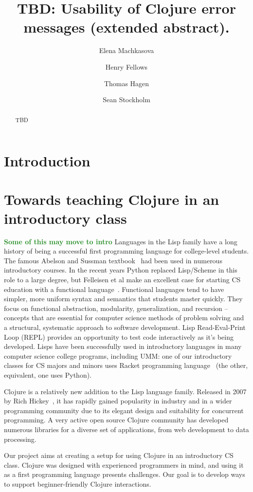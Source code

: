\documentclass[submission,copyright,creativecommons]{eptcs}
\title{TBD: Usability of Clojure error messages (extended abstract).}
\author{Elena Machkasova 
\institute{University of Minnesota, Morris
\email{elenam@morris.umn.edu}}
\and
Henry Fellows
\institute{University of Minnesota, Morris
\email{?@morris.umn.edu}}
\and 
Thomas Hagen
\institute{University of Minnesota, Morris
\email{hagen715@morris.umn.edu}}
\and Sean Stockholm
\institute{University of Minnesota, Morris
\email{?@morris.umn.edu}}
}
\newcommand{\allcomments}[1]{{#1}}
\newcommand{\emcomment}[1]{{\bf \textcolor{ForestGreen}{\allcomments{{#1}}}}}
\begin{document}
\maketitle

\begin{abstract}
TBD
\end{abstract}

\section{Introduction}\label{sec:intro}

\section{Towards teaching Clojure in an introductory class}\label{sec:project}
\emcomment{Some of this may move to intro}
Languages in the Lisp family have a long history of being a successful first programming language for college-level students.
The famous Abelson and Sussman textbook~\cite{Abelson} had been used in numerous introductory courses.
In the recent years Python replaced Lisp/Scheme in this role to a large degree, but 
Felleisen et al make an excellent case for starting CS education with a functional language~\cite{Felleisen:2004}.   
Functional languages tend to have simpler, more uniform syntax and semantics that students master quickly.
They focus on functional abstraction, modularity, generalization, and recursion -- concepts that are essential for computer science methods of 
problem solving and a structural, systematic approach to software development. 
Lisp Read-Eval-Print Loop (REPL) provides an opportunity to test code interactively as it's being developed. 
Lisps have been successfully used in introductory languages in many computer science college programs, including UMM: 
one of our introductory classes for CS majors and minors uses Racket programming language~\cite{htdp,htdp2} (the other,
equivalent, one uses Python). 

Clojure is a relatively new addition to the Lisp language family. Released in 2007 by Rich Hickey~\cite{Hickey:2008}, it has rapidly gained popularity in industry
and in a wider programming community 
due to its elegant design and suitability for concurrent programming. A very active open source Clojure community has developed numerous 
libraries for a diverse set of applications, from web development to data processing. 

Our project aims at creating a setup for using Clojure in an introductory CS class. Clojure was designed with experienced programmers in mind, 
and using it as a first programming language presents challenges. Our goal is to develop ways to support beginner-friendly Clojure interactions. 
\end{document}
